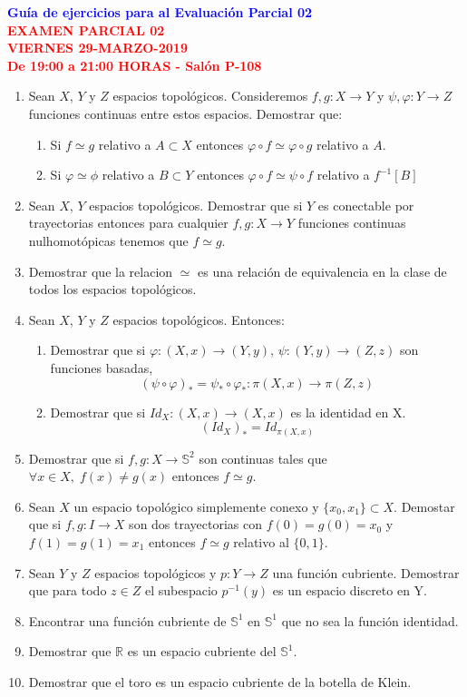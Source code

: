 \documentclass[12pts]{report}
\newcommand{\R}{\mathbb R}
\newcommand{\s}{\mathbb S}
\begin{document}
\begin{center}
\textcolor{blue}{\textbf{\large Guía de ejercicios para al Evaluación Parcial 02}}\\
\vspace{0.5 cm}
\textcolor{red}{\textbf{\large EXAMEN PARCIAL 02 \\ VIERNES
29-MARZO-2019\\ De 19:00 a 21:00 HORAS - Salón P-108}}
\end{center}

\begin{enumerate}
\item Sean $X$, $Y$ y $Z$ espacios topológicos. Consideremos $f,g: X\to Y$ y $\psi ,\varphi: Y \to Z$ funciones continuas entre estos espacios. Demostrar que:
\begin{enumerate}
\item Si $f\simeq g$ relativo a $A\subset X$ entonces $\varphi \circ f \simeq \varphi\circ g$ relativo a $A$.
\item Si $\varphi \simeq \phi$ relativo a $B\subset Y$ entonces $\varphi \circ f \simeq \psi \circ f$ relativo a $f^{-1}[B]$
\end{enumerate} 
\item Sean $X$, $Y$ espacios topológicos. Demostrar que si $Y$ es conectable por trayectorias entonces para cualquier $f,g : X\to Y$ funciones continuas nulhomotópicas tenemos que $f\simeq g$.
\item Demostrar que la relacion $\simeq$ es una relación de equivalencia en la clase de todos los espacios topológicos.
\item Sean $X$, $Y$ y $Z$ espacios topológicos. Entonces:
\begin{enumerate}
\item Demostrar que si $\varphi: (X,x) \to (Y,y)$, $\psi: (Y,y) \to (Z,z)$ son funciones basadas,
$$(\psi \circ \varphi)_* = \psi_*\circ \varphi_* : \pi(X,x)\to \pi(Z,z)$$
\item Demostrar que si $Id_X: (X,x)\to (X,x)$ es la identidad en X.
$$(Id_X)_* = Id_{\pi(X,x)}$$
\end{enumerate}
\item Demostrar que si $f,g :X \to \s^2$ son continuas tales que $\forall x\in X,\; f(x)\neq g(x)$ entonces $f\simeq g$.
\item Sean $X$ un espacio topológico simplemente conexo y $\{x_0,x_1\}\subset X$. Demostar que si $f,g: I \to X$ son dos trayectorias con $f(0)=g(0)=x_0$ y $f(1)=g(1)=x_1$ entonces $f\simeq g$ relativo al $\{0,1\}$.
\item Sean $Y$ y $Z$ espacios topológicos y $p: Y \to Z$ una función cubriente. Demostrar que para todo $z\in Z$ el subespacio $p^{-1}(y)$ es un espacio discreto en Y.
\item Encontrar una función cubriente de $\s^1$ en $\s^1$ que no sea la función identidad.
\item Demostrar que $\R$ es un espacio cubriente del $\s^1$.
\item Demostrar que el toro es un espacio cubriente de la botella de Klein.


\end{enumerate}
\end{document}
